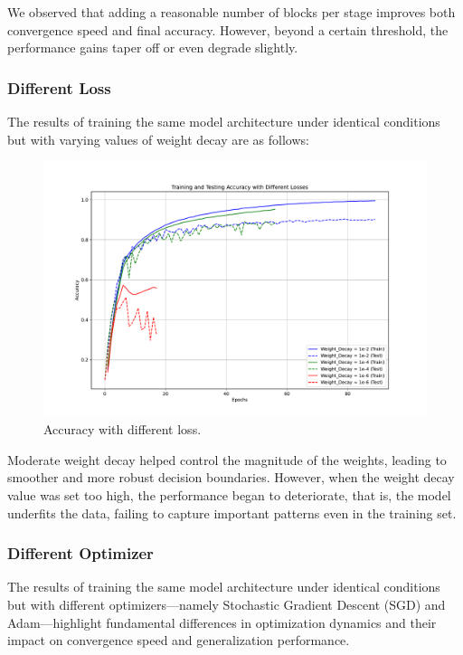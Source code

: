 \documentclass{article}
\begin{document}
We observed that adding a reasonable number of blocks per stage improves both convergence speed and final accuracy. However, beyond a certain threshold, the performance gains taper off or even degrade slightly. 

\subsubsection{Different Loss}

The results of training the same model architecture under identical conditions but with varying values of weight decay are as follows: 

\begin{figure}[H]
  \centering
  \includegraphics[width=0.7\linewidth]{figures/accuracy_different_loss.pdf}
  \caption{Accuracy with different loss.}
  \label{fig:accuracy_different_loss}
\end{figure}

Moderate weight decay helped control the magnitude of the weights, leading to smoother and more robust decision boundaries.
However, when the weight decay value was set too high, the performance began to deteriorate, that is, the model underfits the data, failing to capture important patterns even in the training set.

\subsubsection{Different Optimizer}

The results of training the same model architecture under identical conditions but with different optimizers—namely Stochastic Gradient Descent (SGD) and Adam—highlight fundamental differences in optimization dynamics and their impact on convergence speed and generalization performance.
\end{document}
